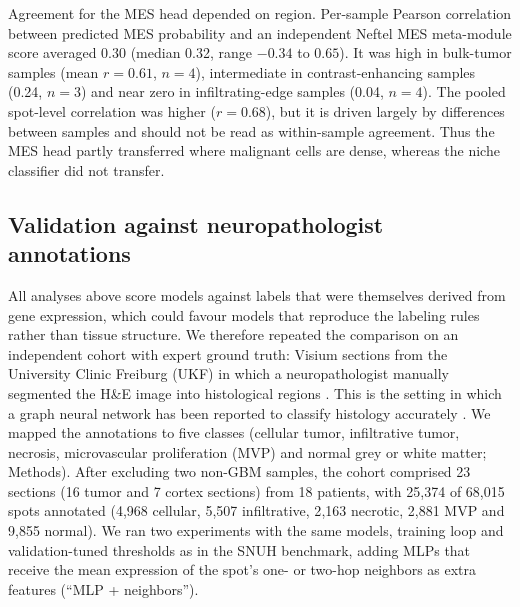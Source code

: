 \documentclass[11pt,letterpaper]{article}
\begin{document}
Agreement for the MES head depended on region. Per-sample Pearson correlation between predicted MES probability and an independent Neftel MES meta-module score \cite{neftel2019} averaged $0.30$ (median 0.32, range $-0.34$ to $0.65$). It was high in bulk-tumor samples (mean $r = 0.61$, $n = 4$), intermediate in contrast-enhancing samples (0.24, $n = 3$) and near zero in infiltrating-edge samples (0.04, $n = 4$). The pooled spot-level correlation was higher ($r = 0.68$), but it is driven largely by differences between samples and should not be read as within-sample agreement. Thus the MES head partly transferred where malignant cells are dense, whereas the niche classifier did not transfer.

\subsection{Validation against neuropathologist annotations}

All analyses above score models against labels that were themselves derived from gene expression, which could favour models that reproduce the labeling rules rather than tissue structure. We therefore repeated the comparison on an independent cohort with expert ground truth: Visium sections from the University Clinic Freiburg (UKF) \cite{ravi2022} in which a neuropathologist manually segmented the H\&E image into histological regions \cite{ritter2025}. This is the setting in which a graph neural network has been reported to classify histology accurately \cite{ritter2025}. We mapped the annotations to five classes (cellular tumor, infiltrative tumor, necrosis, microvascular proliferation (MVP) and normal grey or white matter; Methods). After excluding two non-GBM samples, the cohort comprised 23 sections (16 tumor and 7 cortex sections) from 18 patients, with 25{,}374 of 68{,}015 spots annotated (4{,}968 cellular, 5{,}507 infiltrative, 2{,}163 necrotic, 2{,}881 MVP and 9{,}855 normal). We ran two experiments with the same models, training loop and validation-tuned thresholds as in the SNUH benchmark, adding MLPs that receive the mean expression of the spot's one- or two-hop neighbors as extra features (``MLP + neighbors'').
\end{document}
